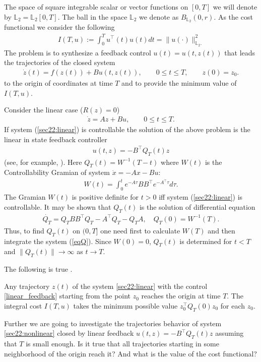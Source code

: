 \documentclass[../main.tex]{subfiles}
\begin{document}
The space of square integrable scalar or vector functions on $ [0,T] $ we will denote by $ \mathbb{L}_2 = \mathbb{L}_2[0,T] $. The ball in the space $\mathbb{L}_2$ we denote as $B_{\mathbb{L}_2}(0,r)$. As the cost functional we consider the following
\begin{gather}\label{cost}
		I(T,u):=\int_0^Tu^\top (t)u(t)dt= 	\lVert u(\cdot)\rVert^2_{\mathbb{L}_2.} 
\end{gather}
The problem is to synthesize a feedback control $u(t)=u(t,z(t))$ that leads the trajectories of the closed system 
\begin{gather*}
	\dot{z}(t)=f(z(t))+B u(t,z(t)),\qquad 0 \leqslant t \leqslant T, \qquad z(0) = z_0.
\end{gather*}
to the origin of coordinates at  time $T$ and to provide the minimum value of $I(T,u)$. 

Consider the linear case ($R(z)=0$)
\begin{gather}\label{sec22:linear}
	\dot{z} =  A  z + B u, \qquad 0 \leqslant t \leqslant T.
\end{gather}
If  system (\ref{sec22:linear}) is controllable the solution of the above problem  is the linear in state feedback controller 
\begin{gather}\label{linear_feedback}
	u(t,z) = -B^{\top} Q_T(t) z
\end{gather}
(see, for example, \cite{Abgar,Kur1,GusevOsipov}).
Here $Q_T(t)=W^{-1}(T-t)$ where $W(t)$ is the Controllability Gramian of system $\dot{x} = -A x - B u$:
\begin{gather*}
    W(t) = \int_0^t e^{-A\tau}BB^\top e^{-A^{\top}\tau}d\tau. 
\end{gather*}
The Gramian $W(t)$ is positive definite for $t>0$ iff  
system (\ref{sec22:linear}) is controllable. It may be shown that $Q_T(t)$ is the solution of differential equation 
\begin{gather}\label{eqQ}
	\dot{Q_T}  = Q_T B B^{\top} Q_T - A^{\top}Q_T - Q_T A, \quad Q_T(0)=W^{-1}(T).
\end{gather}
Thus, to find $Q_T(t)$ on  $(0,T]$ one need first to calculate $W(T)$ and then integrate the system (\ref{eqQ}).
Since $W(0)=0$, $Q_T(t)$ is determined for $t<T$ and 
$\|Q_T(t)\| \to \infty$ as $t\to T$. 

The following is true \cite{Abgar,Kur1,GusevOsipov}.
\begin{utv}
Any trajectory $z(t)$ of the system \eqref{sec22:linear} with the control \eqref{linear_feedback} starting from the point $ z_0 $ reaches the origin at time $T$. The  integral cost $I(T,u)$ takes the minimum possible value $z^{\top}_0 Q_T(0) z_0 $ for each $z_0$.
\end{utv}
Further we are going to investigate the trajectories behavior of system \eqref{sec22:nonlinear} closed by linear feedback $ u(t,z) = -B^{\top} Q_T(t) z$
assuming that $T$ is  small enough. Is it true that all trajectories starting in some neighborhood of the origin reach  it? And what is the value of the cost functional? 
\end{document}
